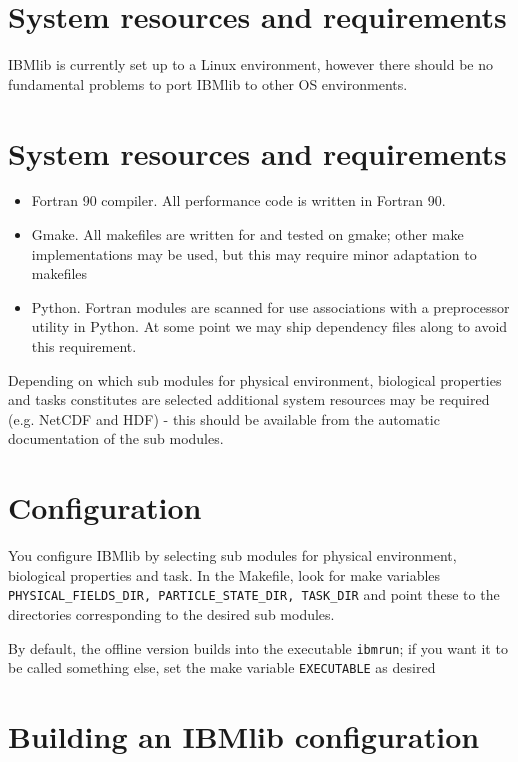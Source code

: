 \section{System resources and requirements}

IBMlib is currently set up to a Linux environment, however
there should be no fundamental problems to port IBMlib to
other OS environments.

\section{System resources and requirements}

\begin{itemize}
  \item Fortran 90 compiler. All performance code is written in Fortran 90.
  \item Gmake. All makefiles are written for and tested on gmake; other
        make implementations may be used, but this may require 
        minor adaptation to makefiles
  \item Python. Fortran modules are scanned for use associations with a 
        preprocessor utility in Python. At some point we may ship 
        dependency files along to avoid this requirement.

\end{itemize}
Depending on which sub modules for physical environment, biological
properties and tasks constitutes are selected additional system resources
may be required (e.g. NetCDF and HDF) - this should be available from the 
automatic documentation of the sub modules.

\section{Configuration}

You configure IBMlib by selecting sub modules for physical environment, biological
properties and task. In the Makefile, look for make variables
{\tt PHYSICAL\_FIELDS\_DIR,  PARTICLE\_STATE\_DIR,  TASK\_DIR} and point these
to the directories corresponding to the desired sub modules. 

By default, the offline version builds into the executable {\tt  ibmrun}; if you want it
to be called something else, set the make variable {\tt EXECUTABLE} as desired   

\section{Building an IBMlib configuration} 

